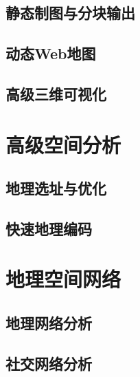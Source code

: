\documentclass[letterpaper,10pt,english]{sphinxmanual}
\begin{document}
\subsection{静态制图与分块输出}
\label{gispark_mapping:_u9759_u6001_u5236_u56fe_u4e0e_u5206_u5757_u8f93_u51fa}

\subsection{动态Web地图}
\label{gispark_mapping:_u52a8_u6001Web_u5730_u56fe}

\subsection{高级三维可视化}
\label{gispark_mapping:_u9ad8_u7ea7_u4e09_u7ef4_u53ef_u89c6_u5316}

\section{高级空间分析}
\label{gispark_analyst:_u9ad8_u7ea7_u7a7a_u95f4_u5206_u6790}\label{gispark_analyst::doc}

\subsection{地理选址与优化}
\label{gispark_analyst:_u5730_u7406_u9009_u5740_u4e0e_u4f18_u5316}

\subsection{快速地理编码}
\label{gispark_analyst:_u5feb_u901f_u5730_u7406_u7f16_u7801}

\section{地理空间网络}
\label{gispark_network:_u5730_u7406_u7a7a_u95f4_u7f51_u7edc}\label{gispark_network::doc}

\subsection{地理网络分析}
\label{gispark_network:_u5730_u7406_u7f51_u7edc_u5206_u6790}

\subsection{社交网络分析}
\label{gispark_network:_u793e_u4ea4_u7f51_u7edc_u5206_u6790}
\end{document}
